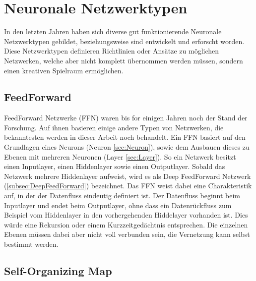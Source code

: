 
\section{Neuronale Netzwerktypen}

In den letzten Jahren haben sich diverse gut funktionierende Neuronale Netzwerktypen gebildet, beziehungsweise sind entwickelt und erforscht worden. 
Diese Netzwerktypen definieren Richtlinien oder Ansätze zu möglichen Netzwerken, welche aber nicht komplett übernommen werden müssen, sondern einen kreativen Spielraum ermöglichen. \\


\subsection{FeedForward}
\label{subsec:FeedForward}

FeedForward Netzwerke (FFN) waren bis for einigen Jahren noch der Stand der Forschung.
Auf ihnen basieren einige andere Typen von Netzwerken, die bekanntesten werden in dieser Arbeit noch behandelt.
Ein FFN basiert auf den Grundlagen eines Neurons (Neuron \ref{sec:Neuron}), sowie dem Ausbauen dieses zu Ebenen mit mehreren Neuronen (Layer \ref{sec:Layer}).
So ein Netzwerk besitzt einen Inputlayer, einen Hiddenlayer sowie einen Outputlayer.
Sobald das Netzwerk mehrere Hiddenlayer aufweist, wird es als Deep FeedForward Netzwerk (\ref{subsec:DeepFeedForward}) bezeichnet.
Das FFN weist dabei eine Charakteristik auf, in der der Datenfluss eindeutig definiert ist. 
Der Datenfluss beginnt beim Inputlayer und endet beim Outputlayer, ohne dass ein Datenrückfluss zum Beispiel vom Hiddenlayer in den vorhergehenden Hiddelayer vorhanden ist.
Dies würde eine Rekursion oder einem Kurzzeitgedächtnis entsprechen.
Die einzelnen Ebenen müssen dabei aber nicht voll verbunden sein, die Vernetzung kann selbst bestimmt werden.

\subsection{Self-Organizing Map}
\label{subsec:SelfOrganizingMap}

